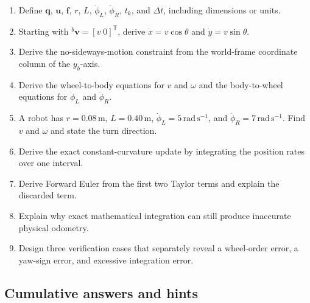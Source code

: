\documentclass[
  australian,
  12pt,
  letterpaper,
  DIV=11,
  numbers=noendperiod,
  twoside]{scrreprt}
\providecommand{\tightlist}{%
  \setlength{\itemsep}{0pt}\setlength{\parskip}{0pt}}
\begin{document}

\begin{enumerate}
\def\labelenumi{\arabic{enumi}.}
\tightlist
\item
  Define \(\mathbf q\), \(\mathbf u\), \(\mathbf f\), \(r\), \(L\),
  \(\dot\phi_L\), \(\dot\phi_R\), \(t_k\), and \(\Delta t\), including
  dimensions or units.
\item
  Starting with \({}^{b}\mathbf v=[v\;0]^\mathsf T\), derive
  \(\dot x=v\cos\theta\) and \(\dot y=v\sin\theta\).
\item
  Derive the no-sideways-motion constraint from the world-frame
  coordinate column of the \(y_b\)-axis.
\item
  Derive the wheel-to-body equations for \(v\) and \(\omega\) and the
  body-to-wheel equations for \(\dot\phi_L\) and \(\dot\phi_R\).
\item
  A robot has \(r=0.08\,\mathrm m\), \(L=0.40\,\mathrm m\),
  \(\dot\phi_L=5\,\mathrm{rad\,s^{-1}}\), and
  \(\dot\phi_R=7\,\mathrm{rad\,s^{-1}}\). Find \(v\) and \(\omega\) and
  state the turn direction.
\item
  Derive the exact constant-curvature update by integrating the position
  rates over one interval.
\item
  Derive Forward Euler from the first two Taylor terms and explain the
  discarded term.
\item
  Explain why exact mathematical integration can still produce
  inaccurate physical odometry.
\item
  Design three verification cases that separately reveal a wheel-order
  error, a yaw-sign error, and excessive integration error.
\end{enumerate}

\subsection*{Cumulative answers and
hints}\label{cumulative-answers-and-hints-1}
\end{document}

